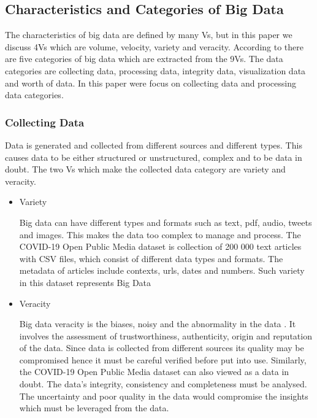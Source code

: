 \documentclass[conference]{IEEEtran}
\begin{document}
\subsection{Characteristics and Categories of Big Data}
The characteristics of big data are defined by many Vs, but in this paper we discuss 4Vs which are volume, velocity, variety and veracity. According to \cite{Owais} there are five categories of big data which are extracted from the 9Vs. The data categories are collecting data, processing data, integrity data, visualization data and worth of data.  In this paper were focus on collecting data and processing data categories. 

\subsubsection{Collecting Data}
Data is generated and collected from different sources and different types.  This causes data to be either structured or unstructured, complex and to be data in doubt. The two Vs which make the collected data category are variety and veracity. 

\begin{itemize}
    \item Variety
    
    Big data can have different types and formats such as text, pdf, audio, tweets and images. This makes the data too complex to manage and process. The COVID-19 Open Public Media dataset is collection of 200 000 text articles with CSV files, which consist of different data types and formats.  The metadata of articles include contexts, urls, dates and numbers. Such variety in this dataset represents Big Data\cite{Johnson et al}
    \item Veracity
    
    Big data veracity is the biases, noisy and the abnormality in the data \cite{Owais}.  It involves the assessment of trustworthiness, authenticity, origin and reputation of the data. Since data is collected from different sources its quality may be compromised hence it must be careful verified before put into use. Similarly, the COVID-19 Open Public Media dataset can also viewed as a data in doubt. The data’s integrity, consistency and completeness must be analysed. The uncertainty and poor quality in the data would compromise the insights which must be leveraged from the data. 
\end{itemize}
\end{document}
